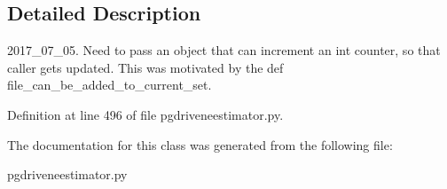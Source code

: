 \subsection{Detailed Description}
\begin{DoxyVerb}2017_07_05.  Need to pass an object that can increment an int
counter, so that caller gets updated.  This was
motivated by the def file_can_be_added_to_current_set.
\end{DoxyVerb}
 

Definition at line 496 of file pgdriveneestimator.\+py.



The documentation for this class was generated from the following file\+:\begin{DoxyCompactItemize}
\item 
pgdriveneestimator.\+py\end{DoxyCompactItemize}
